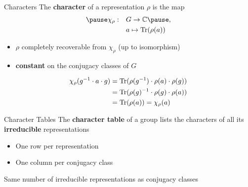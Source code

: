 \begin{frame}{Characters}
    \large
    The \textbf{character} of a representation $\rho$ is the map
    \Large
    \begin{align*}
        \pause
        \chi_\rho: \quad & G \to \C \pause , \\
        & a \mapsto \Tr(\rho(a))
    \end{align*}
    
    \pause
    \large
    \begin{itemize}
        \item $\rho$ completely recoverable from $\chi_\rho$ (up to isomorphism) \pause
        \item \textbf{constant} on the conjugacy classes of $G$
    \end{itemize}
    \begin{align*}
        \chi_\rho(g^{-1} \cdot a \cdot g)
        & = \operatorname{Tr}(\rho(g^{-1}) \cdot \rho(a) \cdot \rho(g)) \\
        & = \operatorname{Tr}(\rho(g)^{-1} \cdot \rho(g) \cdot \rho(a)) \\
        & = \operatorname{Tr}(\rho(a)) = \chi_\rho(a)
    \end{align*}

    \normalsize
    {\hspace*{\fill} \cite{fulton2013}}
    
\end{frame}

\begin{frame}{Character Tables}
    \large
    The \textbf{character table} of a group lists the characters of all its \textbf{irreducible} representations
    
    \pause
    \vspace{1em}
    \begin{itemize}
        \item One row per representation \pause
        \item One column per conjugacy class
    \end{itemize}
    
    \vspace{1em}
    \pause
    Same number of irreducible representations as conjugacy classes

    \vspace{1em}
    \normalsize
    {\hspace*{\fill} \cite{fulton2013}}

\end{frame}
